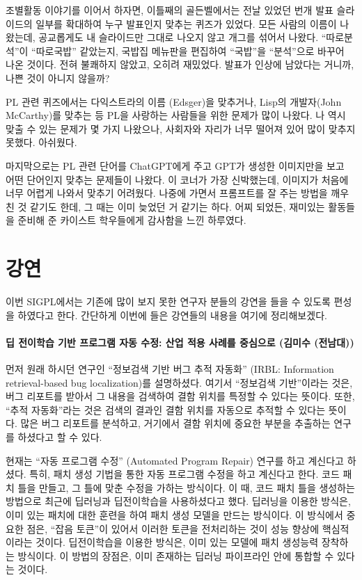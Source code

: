 \documentclass{article}
\begin{document}
조별활동 이야기를 이어서 하자면, 이틀째의 골든벨에서는 전날 있었던 번개 발표 슬라이드의 일부를 확대하여 누구 발표인지 맞추는 퀴즈가 있었다.
모든 사람의 이름이 나왔는데, 공교롭게도 내 슬라이드만 그대로 나오지 않고 개그를 섞어서 나왔다.
``따로분석''이 ``따로국밥'' 같았는지, 국밥집 메뉴판을 편집하여 ``국밥''을 ``분석''으로 바꾸어 나온 것이다.
전혀 불쾌하지 않았고, 오히려 재밌었다.
발표가 인상에 남았다는 거니까, 나쁜 것이 아니지 않을까?

PL 관련 퀴즈에서는 다익스트라의 이름 (Edsger)을 맞추거나, Lisp의 개발자(John McCarthy)를 맞추는 등 PL을 사랑하는 사람들을 위한 문제가 많이 나왔다.
나 역시 맞출 수 있는 문제가 몇 가지 나왔으나, 사회자와 자리가 너무 떨어져 있어 많이 맞추지 못했다. 아쉬웠다.

마지막으로는 PL 관련 단어를 ChatGPT에게 주고 GPT가 생성한 이미지만을 보고 어떤 단어인지 맞추는 문제들이 나왔다.
이 코너가 가장 신박했는데, 이미지가 처음에 너무 어렵게 나와서 맞추기 어려웠다.
나중에 가면서 프롬프트를 잘 주는 방법을 깨우친 것 같기도 한데, 그 때는 이미 늦었던 거 같기는 하다.
어찌 되었든, 재미있는 활동들을 준비해 준 카이스트 학우들에게 감사함을 느낀 하루였다.
\section{강연}
이번 SIGPL에서는 기존에 많이 보지 못한 연구자 분들의 강연을 들을 수 있도록 편성을 하였다고 한다.
간단하게 이번에 들은 강연들의 내용을 여기에 정리해보겠다.

\paragraph{딥 전이학습 기반 프로그램 자동 수정: 산업 적용 사례를 중심으로 (김미수 (전남대))}
먼저 원래 하시던 연구인 ``정보검색 기반 버그 추적 자동화'' (IRBL: Information retrieval-based bug localization)를 설명하셨다.
여기서 ``정보검색 기반''이라는 것은, 버그 리포트를 받아서 그 내용을 검색하여 결함 위치를 특정할 수 있다는 뜻이다.
또한, ``추적 자동화''라는 것은 검색의 결과인 결함 위치를 자동으로 추적할 수 있다는 뜻이다.
많은 버그 리포트를 분석하고, 거기에서 결함 위치에 중요한 부분을 추출하는 연구를 하셨다고 할 수 있다.

현재는 ``자동 프로그램 수정'' (Automated Program Repair) 연구를 하고 계신다고 하셨다.
특히, 패치 생성 기법을 통한 자동 프로그램 수정을 하고 계신다고 한다.
코드 패치 틀을 만들고, 그 틀에 맞춘 수정을 가하는 방식이다.
이 때, 코드 패치 틀을 생성하는 방법으로 최근에 딥러닝과 딥전이학습을 사용하셨다고 했다.
딥러닝을 이용한 방식은, 이미 있는 패치에 대한 훈련을 하여 패치 생성 모델을 만드는 방식이다.
이 방식에서 중요한 점은, ``잡음 토큰''이 있어서 이러한 토큰을 전처리하는 것이 성능 향상에 핵심적이라는 것이다.
딥전이학습을 이용한 방식은, 이미 있는 모델에 패치 생성능력 장착하는 방식이다.
이 방법의 장점은, 이미 존재하는 딥러닝 파이프라인 안에 통합할 수 있다는 것이다.
\end{document}
